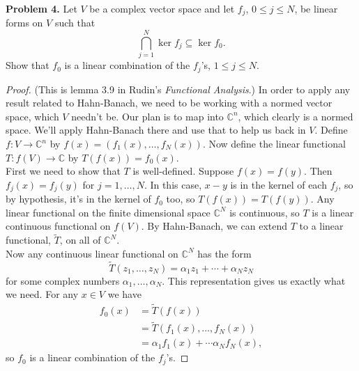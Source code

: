 \documentclass[11pt,letterpaper]{report}
\newcommand{\complex}{\mathbb{C}}
\begin{document}
\noindent\textbf{Problem 4. }
Let $V$ be a complex vector space and let $f_j$, $0\leq j\leq N$, be linear forms on $V$ such that
\[
\bigcap_{j=1}^N\ker f_j \subseteq \ker f_0.
\]
Show that $f_0$ is a linear combination of the $f_j$'s, $1\leq j\leq N$.
\begin{proof}
	(This is lemma 3.9 in Rudin's \textit{Functional Analysis}.) In order to apply any result related to Hahn-Banach, we need to be working with a normed vector space, which $V$ needn't be.
	Our plan is to map into $\complex^n$, which clearly is a normed space. We'll apply Hahn-Banach there and use that to help us back in $V$. Define $f: V\to \complex^n$ by $f(x) = (f_1(x), \ldots, f_N(x))$. Now define the linear functional $T:f(V)\to \complex$ by $T(f(x)) = f_0(x)$.\\

	First we need to show that $T$ is well-defined. Suppose $f(x) = f(y)$. Then $f_j(x) = f_j(y)$ for $j = 1, \ldots, N$. In this case, $x-y$ is in the kernel of each $f_j$, so by hypothesis, it's in the kernel of $f_0$ too, so $T(f(x)) = T(f(y))$. Any linear functional on the finite dimensional space $\complex^N$ is continuous, so $T$ is a linear continuous functional on $f(V)$. By Hahn-Banach, we can extend $T$ to a linear functional, $\tilde{T}$, on all of $\complex^N$.\\

	Now any continuous linear functional on $\complex^N$ has the form
	\[
	\tilde{T}(z_1, \ldots, z_N) = \alpha_1z_1 + \cdots + \alpha_Nz_N
	\]
	for some complex numbers $\alpha_1, \ldots, \alpha_N$. This representation gives us exactly what we need. For any $x\in V$ we have
	\begin{align*}
		f_0(x) &= \tilde{T}(f(x))\\
		&= \tilde{T}(f_1(x), \ldots, f_N(x))\\
		&= \alpha_1f_1(x) + \cdots \alpha_Nf_N(x),
	\end{align*}
	so $f_0$ is a linear combination of the $f_j$'s.
\end{proof}
\end{document}
